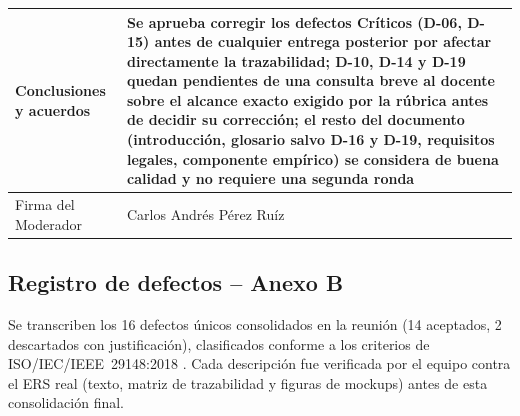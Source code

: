 \documentclass[11pt,a4paper]{article}
\begin{document}
\begin{longtable}{|p{4.5cm}|p{9.5cm}|}
\hline
Conclusiones y acuerdos & Se aprueba corregir los defectos Críticos (D-06, D-15) antes de cualquier entrega posterior por afectar directamente la trazabilidad; D-10, D-14 y D-19 quedan pendientes de una consulta breve al docente sobre el alcance exacto exigido por la rúbrica antes de decidir su corrección; el resto del documento (introducción, glosario salvo D-16 y D-19, requisitos legales, componente empírico) se considera de buena calidad y no requiere una segunda ronda \\
\hline
Firma del Moderador & Carlos Andrés Pérez Ruíz \\
\hline
\end{longtable}

\subsection{Registro de defectos -- Anexo B}
Se transcriben los 16 defectos únicos consolidados en la reunión (14 aceptados, 2 descartados con justificación), clasificados conforme a los criterios de ISO/IEC/IEEE~29148:2018 \cite{iso29148}. Cada descripción fue verificada por el equipo contra el ERS real (texto, matriz de trazabilidad y figuras de mockups) antes de esta consolidación final.
\end{document}
